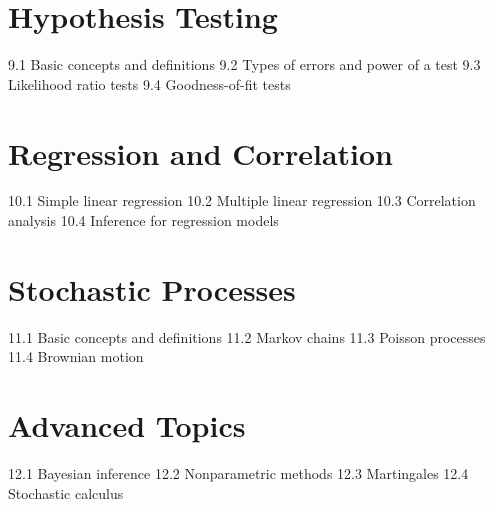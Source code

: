 \section{Hypothesis Testing}
9.1 Basic concepts and definitions
9.2 Types of errors and power of a test
9.3 Likelihood ratio tests
9.4 Goodness-of-fit tests
\section{Regression and Correlation}
10.1 Simple linear regression
10.2 Multiple linear regression
10.3 Correlation analysis
10.4 Inference for regression models
\section{Stochastic Processes}
11.1 Basic concepts and definitions
11.2 Markov chains
11.3 Poisson processes
11.4 Brownian motion
\section{Advanced Topics}
12.1 Bayesian inference
12.2 Nonparametric methods
12.3 Martingales
12.4 Stochastic calculus
